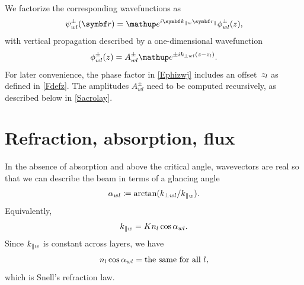We factorize the corresponding wavefunctions as
\begin{equation}\label{Eplawafa}
  \psi^\pm_{w\il}(\r)=\e^{i\k_{\plll w}\r_\plll}\phi^\pm_{w\il}(z),
\end{equation}
with vertical propagation described by a one-dimensional wavefunction
\begin{equation}\label{Ephizwj}
  \phi^\pm_{w\il}(z)=A^\pm_{w\il}\e^{\pm ik_{\perp w\il}(z-z_\il)}.
\end{equation}
%
For later convenience,
the phase factor in \cref{Ephizwj} includes an offset~$z_l$
as defined in \cref{Fdefz}.
%
%
%
The amplitudes $A^\pm_{wl}$ need to be computed recursively,
as described below in \cref{Sacrolay}.

\section{Refraction, absorption, flux}\label{Smulayabs}

In the absence of absorption and above the critical angle,
wavevectors are real
so that we can describe the beam in terms of a glancing angle
\begin{equation}\label{Edef_alpha}
  \alpha_{wl}\coloneqq \arctan(k_{\perp wl}/k_{\parallel w}).
\end{equation}
Equivalently,
\begin{equation}
  k_{\parallel w}=K n_l \cos\alpha_{wl}.
\end{equation}
Since $k_{\parallel w}$ is constant across layers,
we have
\begin{equation}\label{ESnell}
  n_l \cos\alpha_{wl} = \text{the same for all }l,
\end{equation}
which is Snell's refraction law.

